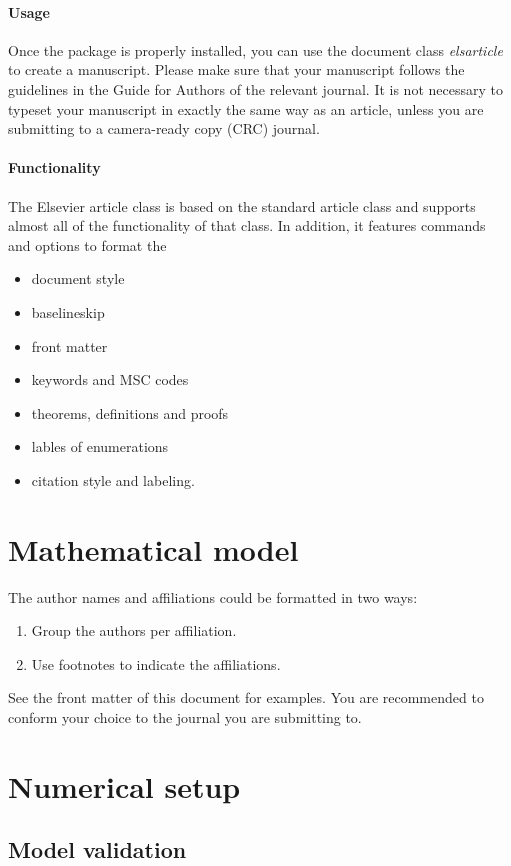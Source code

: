 \documentclass[review]{elsarticle}
\begin{document}
\paragraph{Usage} Once the package is properly installed, you can use the document class \emph{elsarticle} to create a manuscript. Please make sure that your manuscript follows the guidelines in the Guide for Authors of the relevant journal. It is not necessary to typeset your manuscript in exactly the same way as an article, unless you are submitting to a camera-ready copy (CRC) journal.

\paragraph{Functionality} The Elsevier article class is based on the standard article class and supports almost all of the functionality of that class. In addition, it features commands and options to format the
\begin{itemize}
\item document style
\item baselineskip
\item front matter
\item keywords and MSC codes
\item theorems, definitions and proofs
\item lables of enumerations
\item citation style and labeling.
\end{itemize}

\section{Mathematical model}

The author names and affiliations could be formatted in two ways:
\begin{enumerate}[(1)]
\item Group the authors per affiliation.
\item Use footnotes to indicate the affiliations.
\end{enumerate}
See the front matter of this document for examples. You are recommended to conform your choice to the journal you are submitting to.

\section{Numerical setup}

\subsection{Model validation}
\end{document}
